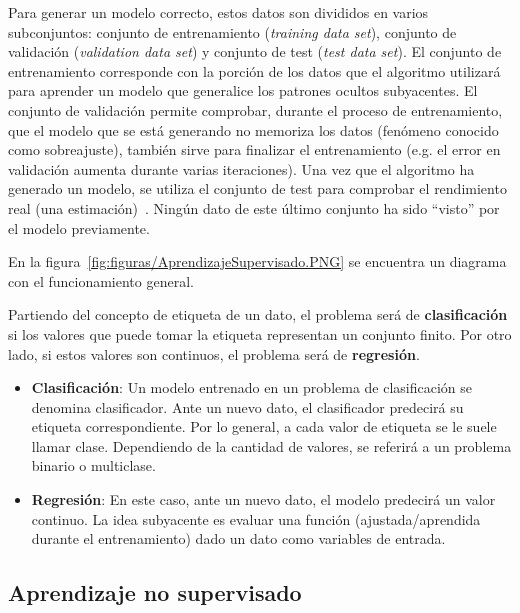 Para generar un modelo correcto, estos datos son divididos en varios subconjuntos: conjunto de entrenamiento (\textit{training data set}), conjunto de validación (\textit{validation data set}) y conjunto de test (\textit{test data set}). El conjunto de entrenamiento corresponde con la porción de los datos que el algoritmo utilizará para aprender un modelo que generalice los patrones ocultos subyacentes. El conjunto de validación permite comprobar, durante el proceso de entrenamiento, que el modelo que se está generando no memoriza los datos (fenómeno conocido como sobreajuste), también sirve para finalizar el entrenamiento (e.g. el error en validación aumenta durante varias iteraciones). Una vez que el algoritmo ha generado un modelo, se utiliza el conjunto de test para comprobar el rendimiento real (una estimación)~\cite{enwiki:conjuntos}. Ningún dato de este último conjunto ha sido ``visto'' por el modelo previamente.


En la figura~\ref{fig:figuras/AprendizajeSupervisado.PNG} se encuentra un diagrama con el funcionamiento general.


Partiendo del concepto de etiqueta de un dato, el problema será de \textbf{clasificación} si los valores que puede tomar la etiqueta representan un conjunto finito. Por otro lado, si estos valores son continuos, el problema será de \textbf{regresión}.

\begin{itemize}
    \item \textbf{Clasificación}: Un modelo entrenado en un problema de clasificación se denomina clasificador. Ante un nuevo dato, el clasificador predecirá su etiqueta correspondiente. Por lo general, a cada valor de etiqueta se le suele llamar clase. Dependiendo de la cantidad de valores, se referirá a un problema binario o multiclase.

    \item \textbf{Regresión}: En este caso, ante un nuevo dato, el modelo predecirá un valor continuo. La idea subyacente es evaluar una función (ajustada/aprendida durante el entrenamiento) dado un dato como variables de entrada.

\end{itemize}


\subsection{Aprendizaje no supervisado}
\label{aprendizaje-no-supervisado}

